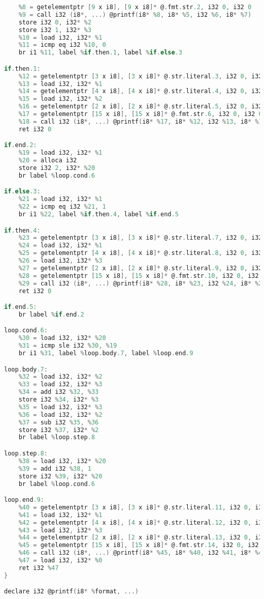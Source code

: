 \newpage
\setcounter{lstlisting}{2}
\begin{lstlisting}[language=go, firstnumber=last, caption={Пример промежуточного представления LLVM IR для вычисления числа Фибоначчи через цикл}]
	%7 = getelementptr [2 x i8], [2 x i8]* @.str.literal.1, i32 0, i32 0
	%8 = getelementptr [9 x i8], [9 x i8]* @.fmt.str.2, i32 0, i32 0
	%9 = call i32 (i8*, ...) @printf(i8* %8, i8* %5, i32 %6, i8* %7)
	store i32 0, i32* %2
	store i32 1, i32* %3
	%10 = load i32, i32* %1
	%11 = icmp eq i32 %10, 0
	br i1 %11, label %if.then.1, label %if.else.3

if.then.1:
	%12 = getelementptr [3 x i8], [3 x i8]* @.str.literal.3, i32 0, i32 0
	%13 = load i32, i32* %1
	%14 = getelementptr [4 x i8], [4 x i8]* @.str.literal.4, i32 0, i32 0
	%15 = load i32, i32* %2
	%16 = getelementptr [2 x i8], [2 x i8]* @.str.literal.5, i32 0, i32 0
	%17 = getelementptr [15 x i8], [15 x i8]* @.fmt.str.6, i32 0, i32 0
	%18 = call i32 (i8*, ...) @printf(i8* %17, i8* %12, i32 %13, i8* %14, i32 %15, i8* %16)
	ret i32 0

if.end.2:
	%19 = load i32, i32* %1
	%20 = alloca i32
	store i32 2, i32* %20
	br label %loop.cond.6

if.else.3:
	%21 = load i32, i32* %1
	%22 = icmp eq i32 %21, 1
	br i1 %22, label %if.then.4, label %if.end.5

if.then.4:
	%23 = getelementptr [3 x i8], [3 x i8]* @.str.literal.7, i32 0, i32 0
	%24 = load i32, i32* %1
	%25 = getelementptr [4 x i8], [4 x i8]* @.str.literal.8, i32 0, i32 0
	%26 = load i32, i32* %3
	%27 = getelementptr [2 x i8], [2 x i8]* @.str.literal.9, i32 0, i32 0
	%28 = getelementptr [15 x i8], [15 x i8]* @.fmt.str.10, i32 0, i32 0
	%29 = call i32 (i8*, ...) @printf(i8* %28, i8* %23, i32 %24, i8* %25, i32 %26, i8* %27)
	ret i32 0

if.end.5:
	br label %if.end.2

loop.cond.6:
	%30 = load i32, i32* %20
	%31 = icmp sle i32 %30, %19
	br i1 %31, label %loop.body.7, label %loop.end.9

loop.body.7:
	%32 = load i32, i32* %2
	%33 = load i32, i32* %3
	%34 = add i32 %32, %33
	store i32 %34, i32* %3
	%35 = load i32, i32* %3
	%36 = load i32, i32* %2
	%37 = sub i32 %35, %36
	store i32 %37, i32* %2
	br label %loop.step.8

loop.step.8:
	%38 = load i32, i32* %20
	%39 = add i32 %38, 1
	store i32 %39, i32* %20
	br label %loop.cond.6

loop.end.9:
	%40 = getelementptr [3 x i8], [3 x i8]* @.str.literal.11, i32 0, i32 0
	%41 = load i32, i32* %1
	%42 = getelementptr [4 x i8], [4 x i8]* @.str.literal.12, i32 0, i32 0
	%43 = load i32, i32* %3
	%44 = getelementptr [2 x i8], [2 x i8]* @.str.literal.13, i32 0, i32 0
	%45 = getelementptr [15 x i8], [15 x i8]* @.fmt.str.14, i32 0, i32 0
	%46 = call i32 (i8*, ...) @printf(i8* %45, i8* %40, i32 %41, i8* %42, i32 %43, i8* %44)
	%47 = load i32, i32* %0
	ret i32 %47
}

declare i32 @printf(i8* %format, ...)
\end{lstlisting}


